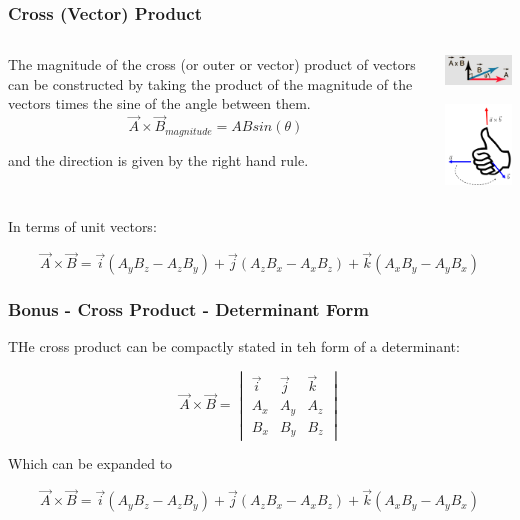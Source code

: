 \documentclass{beamer}
\begin{document}
\begin{frame}\frametitle{Cross (Vector) Product}
\begin{columns}
\begin{column}{6cm}
The magnitude of the cross (or outer or vector) product of vectors can be constructed by taking the product of the magnitude of the vectors times the sine of the angle between them.
\begin{equation}
\vec{A} \times \vec{B}_{magnitude} = AB sin(\theta)
\end{equation}

and the direction is given by the right hand rule.

\end{column}
\begin{column}{5cm}

\begin{center}
\includegraphics[width=4.8cm]{fig/veccross.jpg}

\includegraphics[width=2.8cm]{fig/righthandrule.png}
\end{center}
\end{column}
\end{columns}
In terms of unit vectors:

\begin{equation}
\vec{A} \times \vec{B} = \vec{i}(A_yB_z-A_zB_y) + \vec{j}(A_zB_x-A_xB_z) + \vec{k}(A_xB_y-A_yB_x)
\end{equation}
\end{frame}


\begin{frame}\frametitle{Bonus - Cross Product - Determinant Form}

THe cross product can be compactly stated in teh form of a determinant:

\[
\vec{A} \times \vec{B} =
\begin{vmatrix}
\vec{i} & \vec{j} & \vec{k} \\
A_x & A_y & A_z \\
B_x & B_y & B_z
\end{vmatrix}
\]

Which can be expanded to

\[
\vec{A} \times \vec{B} = \vec{i}(A_yB_z-A_zB_y) + \vec{j}(A_zB_x-A_xB_z) + \vec{k}(A_xB_y-A_yB_x)
\]
\end{frame}
\end{document}

